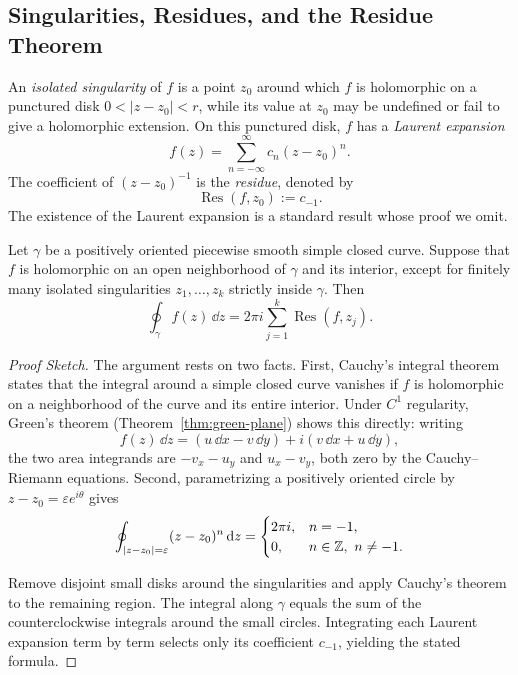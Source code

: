 \subsection{Singularities, Residues, and the Residue Theorem}

\begin{definition}
An \emph{isolated singularity} of $f$ is a point $z_0$ around which $f$ is holomorphic on a punctured disk $0<|z-z_0|<r$, while its value at $z_0$ may be undefined or fail to give a holomorphic extension. On this punctured disk, $f$ has a \emph{Laurent expansion}
\begin{equation}
f(z)=\sum_{n=-\infty}^{\infty}c_n(z-z_0)^n.
\end{equation}
The coefficient of $(z-z_0)^{-1}$ is the \emph{residue}, denoted by
\[
\operatorname{Res}(f,z_0):=c_{-1}.
\]
The existence of the Laurent expansion is a standard result whose proof we omit.
\end{definition}

\begin{theorem}
\label{thm:residue}
Let $\gamma$ be a positively oriented piecewise smooth simple closed curve. Suppose that $f$ is holomorphic on an open neighborhood of $\gamma$ and its interior, except for finitely many isolated singularities $z_1,\dots,z_k$ strictly inside $\gamma$. Then
\begin{equation}
\oint_\gamma f(z)\,\dd z
=2\pi i\sum_{j=1}^k\operatorname{Res}(f,z_j).
\end{equation}

\end{theorem}

\begin{proof}[Proof Sketch]
The argument rests on two facts. First, Cauchy's integral theorem states that the integral around a simple closed curve vanishes if $f$ is holomorphic on a neighborhood of the curve and its entire interior. Under $C^1$ regularity, Green's theorem (Theorem~\ref{thm:green-plane}) shows this directly: writing
\[
f(z)\,\dd z=(u\,\dd x-v\,\dd y)+i(v\,\dd x+u\,\dd y),
\] the two area integrands are $-v_x-u_y$ and $u_x-v_y$, both zero by the Cauchy--Riemann equations. Second, parametrizing a positively oriented circle by $z-z_0=\varepsilon e^{i\theta}$ gives
\begin{equation}
\oint_{|z-z_0|=\varepsilon}(z-z_0)^n\,\dd z
=\begin{cases}2\pi i,&n=-1,\\0,&n\in\Z,\ n\ne-1.\end{cases}
\end{equation}

Remove disjoint small disks around the singularities and apply Cauchy's theorem to the remaining region. The integral along $\gamma$ equals the sum of the counterclockwise integrals around the small circles. Integrating each Laurent expansion term by term selects only its coefficient $c_{-1}$, yielding the stated formula.
\end{proof}

